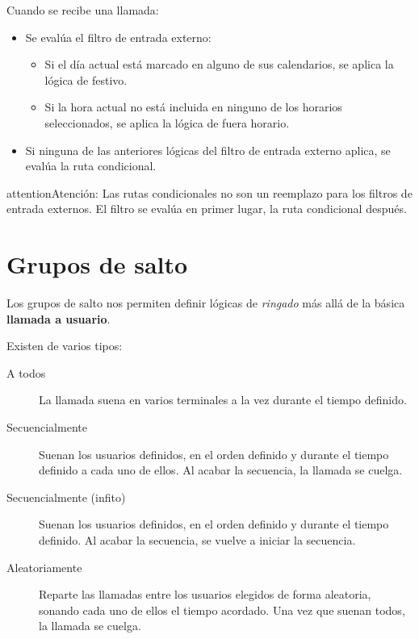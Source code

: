\documentclass[letterpaper,10pt,spanish]{sphinxmanual}
\begin{document}
Cuando se recibe una llamada:
\begin{itemize}
\item {} 
Se evalúa el filtro de entrada externo:
\begin{itemize}
\item {} 
Si el día actual está marcado en alguno de sus calendarios, se aplica la lógica de festivo.

\item {} 
Si la hora actual no está incluida en ninguno de los horarios seleccionados, se aplica la lógica de fuera horario.

\end{itemize}

\item {} 
Si ninguna de las anteriores lógicas del filtro de entrada externo aplica, se evalúa la ruta condicional.

\end{itemize}

\begin{notice}{attention}{Atención:}
Las rutas condicionales no son un reemplazo para los filtros de entrada externos. El filtro se evalúa en primer lugar, la ruta condicional después.
\end{notice}


\section{Grupos de salto}
\label{pbx_features/huntgroups:hunt-groups}\label{pbx_features/huntgroups::doc}\label{pbx_features/huntgroups:huntgroups}
Los grupos de salto nos permiten definir lógicas de \emph{ringado} más allá de la básica \textbf{llamada a usuario}.

Existen de varios tipos:
\begin{description}
\item[{A todos}] \leavevmode{}\label{pbx_features/huntgroups:term-ring-all}
La llamada suena en varios terminales a la vez durante el tiempo definido.

\item[{Secuencialmente}] \leavevmode{}\label{pbx_features/huntgroups:term-sequential}
Suenan los usuarios definidos, en el orden definido y durante el tiempo definido a cada uno de ellos. Al acabar la secuencia, la llamada se cuelga.

\item[{Secuencialmente (infito)}] \leavevmode{}\label{pbx_features/huntgroups:term-sequential-infinite}
Suenan los usuarios definidos, en el orden definido y durante el tiempo definido. Al acabar la secuencia, se vuelve a iniciar la secuencia.

\item[{Aleatoriamente}] \leavevmode{}\label{pbx_features/huntgroups:term-random}
Reparte las llamadas entre los usuarios elegidos de forma aleatoria, sonando cada uno de ellos el tiempo acordado. Una vez que suenan todos, la llamada se cuelga.

\end{description}
\end{document}
